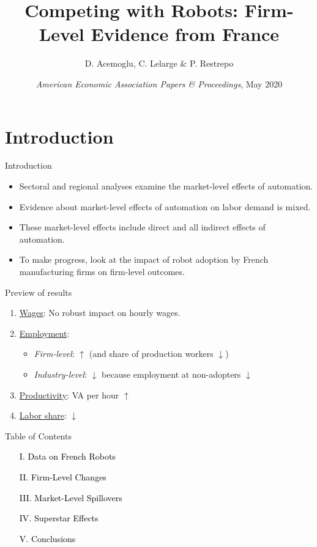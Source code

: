 \documentclass[notes=show]{beamer}
\begin{document}
\title{Competing with Robots: Firm-Level Evidence from France}
\subtitle{}
\author{D. Acemoglu, C. Lelarge \& P. Restrepo}
\date{\textit{American Economic Association Papers \& Proceedings}, May 2020} 
\maketitle

\section{Introduction}

\begin{frame}{Introduction}
\begin{itemize}
\item Sectoral and regional analyses examine the market-level effects of automation. \medskip
\item Evidence about market-level effects of automation on labor demand is mixed. \medskip
\item These market-level effects include direct and all indirect effects of automation. \medskip
\item To make progress, look at the impact of robot adoption by French manufacturing firms on firm-level outcomes.
\end{itemize}
\end{frame}

\begin{frame}{Preview of results}
\begin{enumerate}
\item \underline{Wages}: No robust impact on hourly wages. \medskip
\item \underline{Employment}: \medskip
\begin{itemize}
\item \textit{Firm-level}: $\uparrow$ (and share of production workers $\downarrow$) \medskip
\item \textit{Industry-level}: $\downarrow$ because employment at non-adopters $\downarrow$ \smallskip
\end{itemize}
\item \underline{Productivity}: VA per hour $\uparrow$ \medskip
\item \underline{Labor share}: $\downarrow$
\end{enumerate}
\end{frame}

\begin{frame}{Table of Contents}
\begin{itemize}
\item[\textcolor{black}{I.}] \textcolor{black}{Data on French Robots} \bigskip
\item[\textcolor{black}{II.}] \textcolor{black}{Firm-Level Changes} \bigskip
\item[\textcolor{black}{III.}] \textcolor{black}{Market-Level Spillovers} \bigskip
\item[\textcolor{black}{IV.}] \textcolor{black}{Superstar Effects}  \bigskip
\item[\textcolor{black}{V.}] \textcolor{black}{Conclusions}
\end{itemize}
\end{frame}
\end{document}
